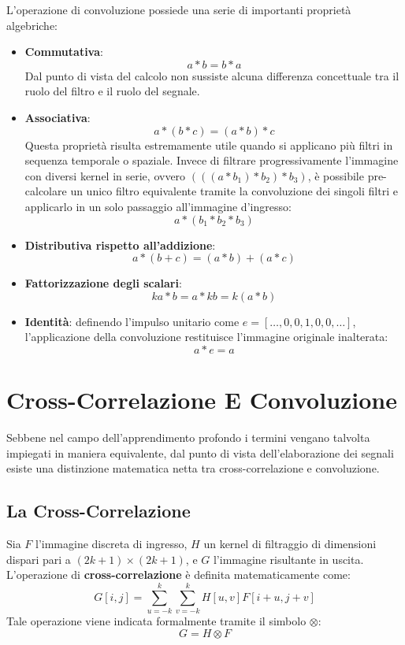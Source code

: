 ﻿\documentclass[11pt, a4paper]{article}
\begin{document}
L'operazione di convoluzione possiede una serie di importanti proprietà algebriche:
\begin{itemize}
    \item \textbf{Commutativa}:
    \[ a * b = b * a \]
    Dal punto di vista del calcolo non sussiste alcuna differenza concettuale tra il ruolo del filtro e il ruolo del segnale.
    \item \textbf{Associativa}:
    \[ a * (b * c) = (a * b) * c \]
    Questa proprietà risulta estremamente utile quando si applicano più filtri in sequenza temporale o spaziale. Invece di filtrare progressivamente l'immagine con diversi kernel in serie, ovvero $(((a * b_1) * b_2) * b_3)$, è possibile pre-calcolare un unico filtro equivalente tramite la convoluzione dei singoli filtri e applicarlo in un solo passaggio all'immagine d'ingresso:
    \[ a * (b_1 * b_2 * b_3) \]
    \item \textbf{Distributiva rispetto all'addizione}:
    \[ a * (b + c) = (a * b) + (a * c) \]
    \item \textbf{Fattorizzazione degli scalari}:
    \[ k a * b = a * k b = k (a * b) \]
    \item \textbf{Identità}: definendo l'impulso unitario come $e = [\dots, 0, 0, 1, 0, 0, \dots]$, l'applicazione della convoluzione restituisce l'immagine originale inalterata:
    \[ a * e = a \]
\end{itemize}

\newpage

\section{Cross-Correlazione E Convoluzione}

Sebbene nel campo dell'apprendimento profondo i termini vengano talvolta impiegati in maniera equivalente, dal punto di vista dell'elaborazione dei segnali esiste una distinzione matematica netta tra cross-correlazione e convoluzione.

\subsection{La Cross-Correlazione}

Sia $F$ l'immagine discreta di ingresso, $H$ un kernel di filtraggio di dimensioni dispari pari a $(2k+1) \times (2k+1)$, e $G$ l'immagine risultante in uscita. L'operazione di \textbf{cross-correlazione} è definita matematicamente come:
\[ \boxed{G[i, j] = \sum_{u=-k}^{k} \sum_{v=-k}^{k} H[u, v] F[i + u, j + v]} \]
Tale operazione viene indicata formalmente tramite il simbolo $\otimes$:
\[ G = H \otimes F \]
\end{document}
